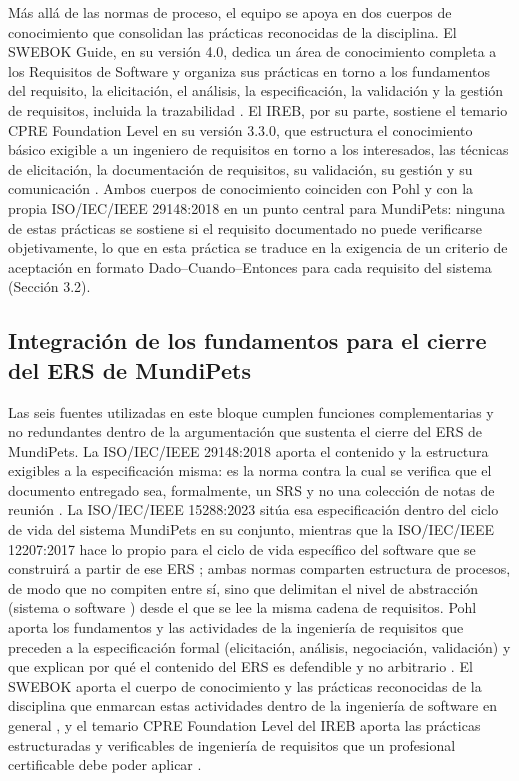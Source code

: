 \documentclass[journal,onecolumn]{IEEEtran}
\begin{document}
	Más allá de las normas de proceso, el equipo se apoya en dos cuerpos de conocimiento que consolidan
	las prácticas reconocidas de la disciplina. El SWEBOK Guide, en su versión 4.0, dedica un área de
	conocimiento completa a los Requisitos de Software y organiza sus prácticas en torno a los
	fundamentos del requisito, la elicitación, el análisis, la especificación, la validación y la gestión
	de requisitos, incluida la trazabilidad \cite{swebok2024}. El IREB, por su parte, sostiene el temario
	CPRE Foundation Level en su versión 3.3.0, que estructura el conocimiento básico exigible a un
	ingeniero de requisitos en torno a los interesados, las técnicas de elicitación, la documentación de
	requisitos, su validación, su gestión y su comunicación \cite{ireb2026}. Ambos cuerpos de conocimiento
	coinciden con Pohl y con la propia ISO/IEC/IEEE 29148:2018 en un punto central para MundiPets: ninguna
	de estas prácticas se sostiene si el requisito documentado no puede verificarse objetivamente, lo que
	en esta práctica se traduce en la exigencia de un criterio de aceptación en formato
	Dado--Cuando--Entonces para cada requisito del sistema (Sección 3.2).
	
	\subsection*{Integración de los fundamentos para el cierre del ERS de MundiPets}
	
	Las seis fuentes utilizadas en este bloque cumplen funciones complementarias y no redundantes dentro
	de la argumentación que sustenta el cierre del ERS de MundiPets. La ISO/IEC/IEEE 29148:2018 aporta el
	contenido y la estructura exigibles a la especificación misma: es la norma contra la cual se verifica
	que el documento entregado sea, formalmente, un SRS y no una colección de notas de reunión
	\cite{ieee29148}. La ISO/IEC/IEEE 15288:2023 sitúa esa especificación dentro del ciclo de vida del
	sistema MundiPets en su conjunto, mientras que la ISO/IEC/IEEE 12207:2017 hace lo propio para el ciclo
	de vida específico del software que se construirá a partir de ese ERS \cite{iso15288,iso12207}; ambas
	normas comparten estructura de procesos, de modo que no compiten entre sí, sino que delimitan el nivel
	de abstracción  (sistema o software ) desde el que se lee la misma cadena de requisitos. Pohl
	aporta los fundamentos y las actividades de la ingeniería de requisitos que preceden a la
	especificación formal (elicitación, análisis, negociación, validación) y que explican por qué el
	contenido del ERS es defendible y no arbitrario \cite{pohl2025}. El SWEBOK aporta el cuerpo de
	conocimiento y las prácticas reconocidas de la disciplina que enmarcan estas actividades dentro de la
	ingeniería de software en general \cite{swebok2024}, y el temario CPRE Foundation Level del IREB aporta
	las prácticas estructuradas y verificables de ingeniería de requisitos que un profesional certificable
	debe poder aplicar \cite{ireb2026}.
	
\end{document}
